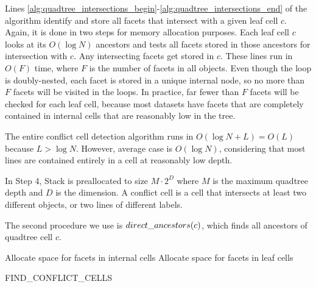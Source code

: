 \documentclass[submission]{gmp2017}
\begin{document}
Lines \ref{alg:quadtree_intersections_begin}-\ref{alg:quadtree_intersections_end} of the algorithm identify and store all facets that intersect with a given leaf cell $c$. Again, it is done in two steps for memory allocation purposes. Each leaf cell $c$ looks at its $O(\log{N})$ ancestors and tests all facets stored in those ancestors for intersection with $c$. Any intersecting facets get stored in $c$. These lines run in $O(F)$ time, where $F$ is the number of facets in all objects. Even though the loop is doubly-nested, each facet is stored in a unique internal node, so no more than $F$ facets will be visited in the loops. In practice, far fewer than $F$ facets will be checked for each leaf cell, because most datasets have facets that are completely contained in internal cells that are reasonably low in the tree.

The entire conflict cell detection algorithm runs in $O(\log{N}+L) = O(L)$ because $L > \log{N}$. However, average case is $O(\log{N})$, considering that most lines are contained entirely in a cell at reasonably low depth.

In Step 4, Stack is preallocated to size $M\cdot2^D$ where $M$ is the maximum quadtree depth and $D$ is the dimension. A conflict cell is a cell that intersects at least two different objects, or two lines of different labels.


The second procedure we use is $direct\_ancestors(c)$, which finds all ancestors of quadtree cell $c$.



\algorithmspace
\begin{algorithm}
  \DontPrintSemicolon
  \LinesNumbered
  \BlankLine
  Allocate space for facets in internal cells\;
   \label{alg:quadtree_containing_end}
  Allocate space for facets in leaf cells\;
   \label{alg:quadtree_intersections_end}
\caption{FIND\_CONFLICT\_CELLS}
\label{alg:find-conflict-cells}
\end{algorithm}
\algorithmspace
\end{document}
